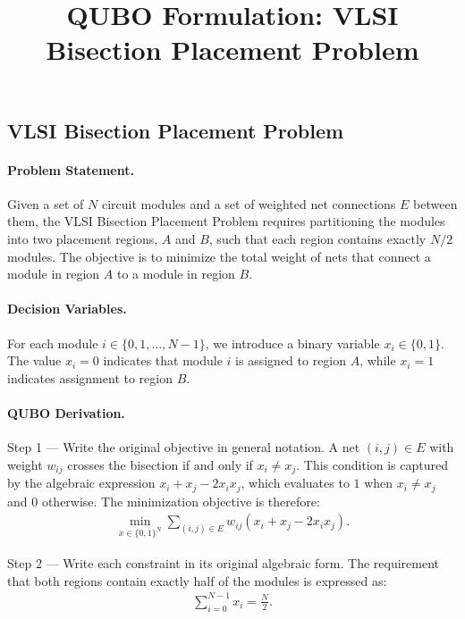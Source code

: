 \documentclass[12pt]{article}
\title{QUBO Formulation: VLSI Bisection Placement Problem}
\date{}
\begin{document}
\maketitle

\subsection*{VLSI Bisection Placement Problem}

\paragraph{Problem Statement.}
Given a set of $N$ circuit modules and a set of weighted net connections $E$ between them, the VLSI Bisection Placement Problem requires partitioning the modules into two placement regions, $A$ and $B$, such that each region contains exactly $N/2$ modules. The objective is to minimize the total weight of nets that connect a module in region $A$ to a module in region $B$.

\paragraph{Decision Variables.}
For each module $i \in \{0, 1, \dots, N-1\}$, we introduce a binary variable $x_i \in \{0, 1\}$. The value $x_i = 0$ indicates that module $i$ is assigned to region $A$, while $x_i = 1$ indicates assignment to region $B$.

\paragraph{QUBO Derivation.}
Step 1 --- Write the original objective in general notation. A net $(i,j) \in E$ with weight $w_{ij}$ crosses the bisection if and only if $x_i \neq x_j$. This condition is captured by the algebraic expression $x_i + x_j - 2x_i x_j$, which evaluates to $1$ when $x_i \neq x_j$ and $0$ otherwise. The minimization objective is therefore:
\begin{align}
    \min_{x \in \{0,1\}^N} \sum_{(i,j) \in E} w_{ij} (x_i + x_j - 2x_i x_j).
\end{align}

Step 2 --- Write each constraint in its original algebraic form. The requirement that both regions contain exactly half of the modules is expressed as:
\begin{align}
    \sum_{i=0}^{N-1} x_i = \frac{N}{2}.
\end{align}
\end{document}
